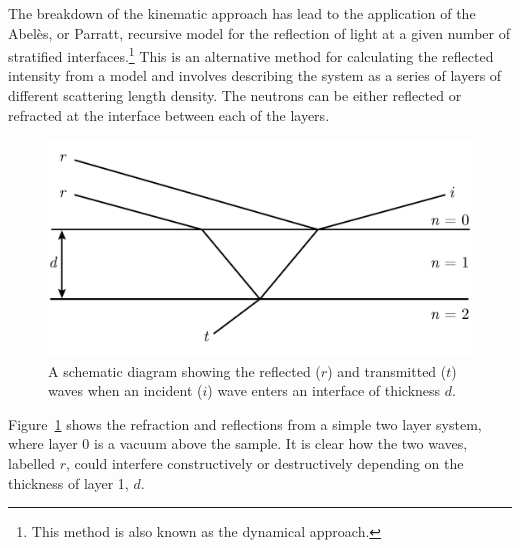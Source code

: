 \documentclass[twoside,symmetric]{tufte-handout}
\begin{document}
The breakdown of the kinematic approach has lead to the application of the Abel\`{e}s,\cite{abeles_sur_1948} or Parratt,\cite{parratt_surface_1954} recursive model for the reflection of light at a given number of stratified interfaces.\footnote{This method is also known as the dynamical approach.}
This is an alternative method for calculating the reflected intensity from a model and involves describing the system as a series of layers of different scattering length density. 
The neutrons can be either reflected or refracted at the interface between each of the layers.
%
\begin{figure}
    \includegraphics[width=\textwidth]{refr}
    \caption{A schematic diagram showing the reflected ($r$) and transmitted ($t$) waves when an incident ($i$) wave enters an interface of thickness $d$.}
    \label{fig:refr}
\end{figure}
% 
Figure~\ref{fig:refr} shows the refraction and reflections from a simple two layer system, where layer \num{0} is a vacuum above the sample. 
It is clear how the two waves, labelled $r$, could interfere constructively or destructively depending on the thickness of layer \num{1}, $d$.
\end{document}
